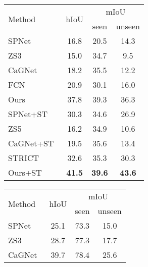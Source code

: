 \documentclass[runningheads]{llncs}
\makeatletter
\newcommand\tabcaption{\def\@captype{table}\caption}
\makeatother
\begin{document}
\begin{figtab}
\footnotesize
  \begin{minipage}[b]{0.48\linewidth}
    \centering
    \tabcaption{Comparison with other methods on COCO Stuff in the zero-shot setting.}
    \vspace{0.5em}
    \begin{tabular}{l|c|c|c}
    \toprule
    \multirow{2}{*}{Method}&\multirow{2}{*}{hIoU} &\multicolumn{2}{c}{mIoU}\\
      \cline{3-4}
     &&seen&unseen\\
    \hline
      SPNet~\cite{xian2019semantic}&16.8&20.5&14.3\\
      ZS3~\cite{bucher2019zero}&15.0&34.7&9.5\\
      CaGNet~\cite{gu2020context}&18.2&35.5&12.2\\
      FCN&20.9  &30.1&16.0\\
      Ours&37.8 &39.3&36.3\\
      \hline
      SPNet+ST~\cite{xian2019semantic}&30.3 &34.6&26.9\\
      ZS5~\cite{bucher2019zero}&16.2 &34.9&10.6\\
      CaGNet+ST~\cite{gu2020context}&19.5 &35.6&13.4\\
      STRICT~\cite{pastore2021closer}&32.6 &35.3&30.3\\
      Ours+ST&\textbf{41.5} &\textbf{39.6}&\textbf{43.6}\\
    \bottomrule
    \end{tabular}
    \label{tab:coco_stuff_res}
  \end{minipage}\quad
  \begin{minipage}[b]{0.48\linewidth}
    \centering
    \tabcaption{Comparison with other methods on Pascal VOC in the zero-shot setting.}
    \vspace{0.5em}
    \begin{tabular}{l|c|c|c}
    \toprule
    \multirow{2}{*}{Method}&\multirow{2}{*}{hIoU} &\multicolumn{2}{c}{mIoU}\\
      \cline{3-4}
     &&seen&unseen\\
    \hline
    SPNet~\cite{xian2019semantic}&25.1       & 73.3                                   & 15.0                 \\
    ZS3~\cite{bucher2019zero}&28.7        & 77.3                                    & 17.7                 \\
    CaGNet~\cite{gu2020context}&39.7      & 78.4                                              & 25.6                 \\

\end{tabular}
\end{minipage}
\end{figtab}
\end{document}
